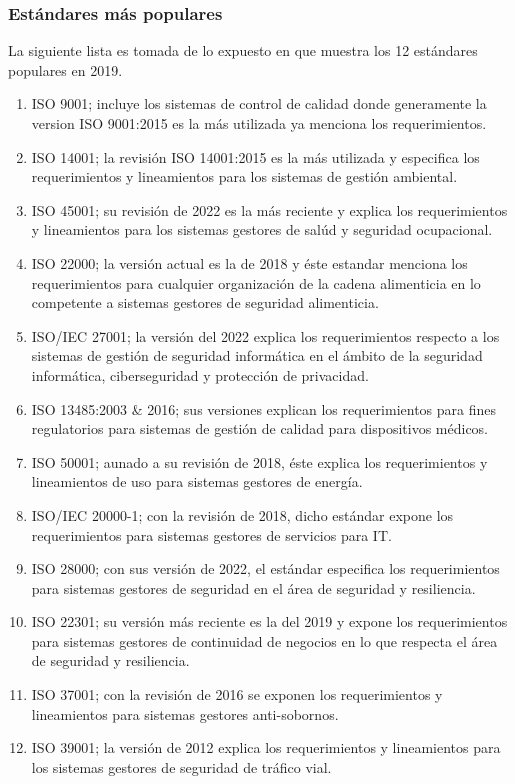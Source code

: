 \subsubsection{Estándares más populares}
La siguiente lista es tomada de lo expuesto en %
que muestra los 12 estándares populares en 2019.
\begin{enumerate}
    \item ISO 9001; incluye los sistemas de control de calidad donde generamente la version ISO 9001:2015 es la más utilizada ya menciona los requerimientos. %
    \item ISO 14001; la revisión ISO 14001:2015 es la más utilizada y especifica los requerimientos y lineamientos para los sistemas de gestión ambiental. %
    \item ISO 45001; su revisión de 2022 es la más reciente y explica los requerimientos y lineamientos para los sistemas gestores de salúd y seguridad ocupacional. %
    \item ISO 22000; la versión actual es la de 2018 y éste estandar menciona los requerimientos para cualquier organización de la cadena alimenticia en lo competente a sistemas gestores de seguridad alimenticia. %
    \item ISO/IEC 27001; la versión del 2022 explica los requerimientos respecto a los sistemas de gestión de seguridad informática en el ámbito de la seguridad informática, ciberseguridad y protección de privacidad. %
    \item ISO 13485:2003 & 2016; sus versiones explican los requerimientos para fines regulatorios para sistemas de gestión de calidad para dispositivos médicos. %
    \item ISO 50001; aunado a su revisión de 2018, éste explica los requerimientos y lineamientos de uso para sistemas gestores de energía. %
    \item ISO/IEC 20000-1; con la revisión de 2018, dicho estándar expone los requerimientos para sistemas gestores de servicios para IT. %
    \item ISO 28000; con sus versión de 2022, el estándar especifica los requerimientos para sistemas gestores de seguridad en el área de seguridad y resiliencia. %
    \item ISO 22301; su versión más reciente es la del 2019 y expone los requerimientos para sistemas gestores de continuidad de negocios en lo que respecta el área de seguridad y resiliencia. %
    \item ISO 37001; con la revisión de 2016 se exponen los requerimientos y lineamientos para sistemas gestores anti-sobornos. %
    \item ISO 39001; la versión de 2012 explica los requerimientos y lineamientos para los sistemas gestores de seguridad de tráfico vial. %
\end{enumerate}

